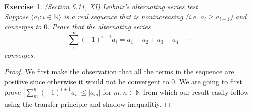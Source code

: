 \documentclass[a4paper, 11pt]{book}
\theoremstyle{plain}
\newtheorem{exercise}{Exercise}[chapter]
\theoremstyle{plain}
\newcommand{\N}{\mathbb{N}}
\newcommand{\la}{\langle}
\newcommand{\ra}{\rangle}
\begin{document}
  \begin{exercise}
    (Section 6.11, XI) Leibniz's alternating series test. \\
    Suppose $\la a_i: i \in \N \ra$ is a real sequence that is nonincreasing (i.e. $a_i \geq a_{i+1}$) and converges to $0$. Prove that the alternating series $$\sum_{1}^\infty (-1)^{i+1} a_i=a_1-a_2+a_3-a_4+\cdots $$ converges. 
  \end{exercise}
  \begin{proof}
    We first make the observation that all the terms in the sequence are positive since otherwise it would not be convergent to $0$. We are going to first prove $\left| \sum_{m}^n (-1)^{i+1} a_i \right| \leq |a_m|$ for $m,n \in \N$ from which our result easily follow using the transfer principle and shadow inequalitiy. 


\end{proof}
\end{document}

